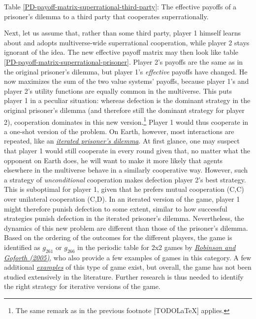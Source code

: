 Table \ref{PD-payoff-matrix-superrational-third-party}: The effective
payoffs of a prisoner's dilemma to a third party that cooperates
superrationally.

Next, let us assume that, rather than some third party, player 1 himself
learns about and adopts multiverse-wide superrational cooperation, while
player 2 stays ignorant of the idea. The new effective payoff matrix may
then look like table
\ref{PD-payoff-matrix-superrational-prisoner}. Player
2's payoffs are the same as in the original prisoner's dilemma, but
player 1's \emph{effective} payoffs have changed. He now maximizes the
sum of the two value systems' payoffs, because player 1's and player 2's
utility functions are equally common in the multiverse. This puts player
1 in a peculiar situation: whereas defection is the dominant strategy in
the original prisoner's dilemma (and therefore still the dominant
strategy for player 2), cooperation dominates in this new
version.\footnote{The same remark as in the previous footnote
  {[}TODOLaTeX{]} applies.} Player 1 would thus cooperate in a one-shot
version of the problem. On Earth, however, most interactions are
repeated, like an
\href{https://en.wikipedia.org/wiki/Prisoner\%27s_dilemma\#The_iterated_prisoner.27s_dilemma}{\emph{iterated
prisoner's dilemma}}. At first glance, one may suspect that player 1
would still cooperate in every round given that, no matter what the
opponent on Earth does, he will want to make it more likely that agents
elsewhere in the multiverse behave in a similarly cooperative way.
However, such a strategy of \emph{unconditional} cooperation makes
defection player 2's best strategy. This is suboptimal for player 1,
given that he prefers mutual cooperation (C,C) over unilateral
cooperation (C,D). In an iterated version of the game, player 1 might
therefore punish defection to some extent, similar to how successful
strategies punish defection in the iterated prisoner's dilemma.
Nevertheless, the dynamics of this new problem are different than those
of the prisoner's dilemma. Based on the ordering of the outcomes for the
different players, the game is identified as \(g_{261}\) or \(g_{266}\)
in the periodic table for 2x2 games by
\href{https://sl4librarian.files.wordpress.com/2016/12/goforthrobinson-the-topology-of-the-2x2-games-a-new-periodic-table.pdf}{\emph{Robinson
and Goforth (2005)}}, who also provide a few examples of games in this
category. A few additional
\href{http://infidels.org/library/modern/mathew/sn-revelation.html}{\emph{examples}}
of this type of game exist, but overall, the game has not been studied
extensively in the literature. Further research is thus needed to
identify the right strategy for iterative versions of the game.

